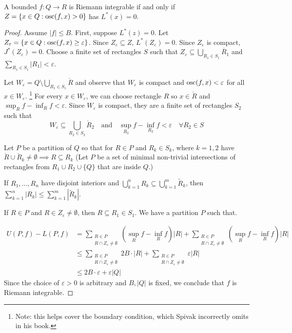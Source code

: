 \begin{theorem}
  A bounded $f : Q \to R$ is Riemann integrable if and only if $Z = \{ x \in Q : \operatorname*{osc} (f,x) > 0 \}$ has $L^*(x) = 0$.
\end{theorem}

\begin{proof}
  Assume $|f| \leq B$. First, suppose $L^*(z) = 0$.
  Let $Z_\varepsilon = \{ x \in Q : \operatorname*{osc} (f,x) \geq \varepsilon\}$.
  Since $Z_\varepsilon \subseteq Z$, $L^*(Z_\varepsilon) = 0$.
  Since $Z_\varepsilon$ is compact, $J^*(Z_\varepsilon) = 0$.
  Choose a finite set of rectangles $S$ such that $Z_\varepsilon \subseteq \bigcup_{R_1 \in S_1} \mathring{R_1}$ and $\sum_{R_1 \in S_1} |R_1| < \varepsilon$.

  Let $W_\varepsilon = Q \setminus \bigcup_{R_1 \in S_1} \mathring{R}$ and observe that $W_\varepsilon$ is compact and $\operatorname*{osc}(f,x) < \varepsilon$ for all $x \in W_\varepsilon$.
  \footnote{Note: this helps cover the boundary condition, which Spivak incorrectly omits in his book.}
  For every $x \in W_\varepsilon$, we can choose rectangle $R$ so $x \in \mathring{R}$ and $\sup_R f - \inf_R f < \varepsilon$.
  Since $W_\varepsilon$ is compact, they are a finite set of rectangles $S_2$ such that
  \[ W_\varepsilon \subseteq \bigcup_{R_2 \in S_2} \mathring{R}_2 \quad \text{and} \quad \sup_{R_2} f - \inf_{R_2} f < \varepsilon \quad \forall R_2 \in S \]

  Let $P$ be a partition of $Q$ so that for $R \in P$ and $R_k \in S_k$, where $k = 1,2$ have $\mathring{R} \cup \mathring{R}_k \ne \emptyset \implies R \subseteq R_k$
  (Let $P$ be a set of minimal non-trivial intersections of rectangles from $R_1 \cup R_2 \cup \{ Q \}$ that are inside $Q$.)

  \begin{lemma}
  If $R_1, \ldots, R_n$ have disjoint interiors and $\bigcup^n_{k=1} R_k \subseteq \bigcup^m_{k=1} \tilde{R}_k$, then $\sum_{k=1}^{n} |R_k| \leq \sum_{k=1}^{m} |\tilde{R}_k|$.
  \end{lemma}

  If $R \in P$ and $R \in Z_\varepsilon \ne \emptyset$, then $R \subseteq R_1 \in S_1$.
  We have a partition $P$ such that.

  \begin{align*}
    U(P,f) - L(P,f) & = \sum_{\substack{R \in P \\ R \cap Z_\varepsilon \ne \emptyset}} \left( \sup_R f - \inf_R f \right) |R| + \sum_{\substack{R \in P \\ R \cap Z_\varepsilon \ne \emptyset}} \left( \sup_R f - \inf_R f \right) |R| \\
                    & \leq \sum_{\substack{R \in P \\ R \cap Z_\varepsilon \ne \emptyset}} 2B \cdot |R| + \sum_{\substack{R \in P \\ R \cap Z_\varepsilon \ne \emptyset}} \varepsilon |R| \\
                    & \leq 2B \cdot \varepsilon + \varepsilon |Q|
  \end{align*}
  Since the choice of $\varepsilon > 0$ is arbitrary and $B, |Q|$ is fixed, we conclude that $f$ is Riemann integrable.


\end{proof}
